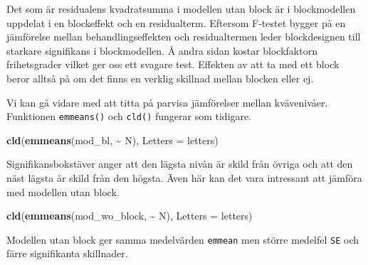 \documentclass[
]{book}
\newenvironment{Shaded}{\begin{snugshade}}{\end{snugshade}}
\newcommand{\AttributeTok}[1]{\textcolor[rgb]{0.13,0.29,0.53}{#1}}
\newcommand{\FunctionTok}[1]{\textcolor[rgb]{0.13,0.29,0.53}{\textbf{#1}}}
\newcommand{\NormalTok}[1]{#1}
\newcommand{\SpecialCharTok}[1]{\textcolor[rgb]{0.81,0.36,0.00}{\textbf{#1}}}
\theoremstyle{definition}
\theoremstyle{definition}
\theoremstyle{definition}
\theoremstyle{definition}
\theoremstyle{remark}
\begin{document}
Det som är residualens kvadratsumma i modellen utan block är i blockmodellen uppdelat i en blockeffekt och en residualterm. Eftersom F-testet bygger på en jämförelse mellan behandlingseffekten och residualtermen leder blockdesignen till starkare signifikans i blockmodellen. Å andra sidan kostar blockfaktorn frihetsgrader vilket ger oss ett svagare test. Effekten av att ta med ett block beror alltså på om det finns en verklig skillnad mellan blocken eller ej.

Vi kan gå vidare med att titta på parvisa jämförelser mellan kvävenivåer. Funktionen \texttt{emmeans()} och \texttt{cld()} fungerar som tidigare.

\begin{Shaded}
\begin{Highlighting}[]
\FunctionTok{cld}\NormalTok{(}\FunctionTok{emmeans}\NormalTok{(mod\_bl, }\SpecialCharTok{\textasciitilde{}}\NormalTok{ N), }\AttributeTok{Letters =}\NormalTok{ letters)}
\end{Highlighting}
\end{Shaded}

Signifikansbokstäver anger att den lägsta nivån är skild från övriga och att den näst lägsta är skild från den högsta. Även här kan det vara intressant att jämföra med modellen utan block.

\begin{Shaded}
\begin{Highlighting}[]
\FunctionTok{cld}\NormalTok{(}\FunctionTok{emmeans}\NormalTok{(mod\_wo\_block, }\SpecialCharTok{\textasciitilde{}}\NormalTok{ N), }\AttributeTok{Letters =}\NormalTok{ letters)}
\end{Highlighting}
\end{Shaded}

Modellen utan block ger samma medelvärden \texttt{emmean} men större medelfel \texttt{SE} och färre signifikanta skillnader.
\end{document}
